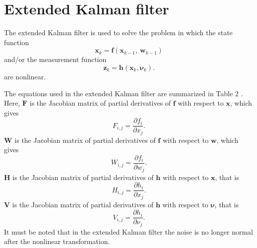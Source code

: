 \documentclass[12pt]{article}
\begin{document}

\section{Extended Kalman filter}\label{extended-kalman-filter}

The extended Kalman filter is used to solve the problem in which the state function
%
\begin{equation}
	\mathbf{x}_{k} = \mathbf{f}( \mathbf{x}_{k - 1},\ \mathbf{w}_{k - 1})
\end{equation}
and/or the measurement function
%
\begin{equation}
	\mathbf{z}_{k} = \mathbf{h}( \mathbf{x}_{k},\boldsymbol{\nu}_{k}).
\end{equation}
%
are nonlinear.

The equations used in the extended Kalman filter are summarized in Table 2 \cite{Welch}. Here, \(\mathbf{F}\) is the Jacobian matrix of partial derivatives of \(\mathbf{f}\) with respect to \(\mathbf{x}\), which gives
%
\begin{equation}
	F_{i,j} = \frac{\partial f_{i}}{\partial x_{j}}.
\end{equation}
%
\(\mathbf{W}\) is the Jacobian matrix of partial derivatives of \(\mathbf{f}\) with respect to \(\mathbf{w}\), which gives
%
\begin{equation}
	W_{i,j} = \frac{\partial f_{i}}{\partial w_{j}}.
\end{equation}
%
\(\mathbf{H}\) is the Jacobian matrix of partial derivatives of \(\mathbf{h}\) with respect to \(\mathbf{x}\), that is
%
\begin{equation}
	H_{i,j} = \frac{\partial h_{i}}{\partial x_{j}}.
\end{equation}
%
\(\mathbf{V}\) is the Jacobian matrix of partial derivatives of \(\mathbf{h}\) with respect to \(\boldsymbol{\nu}\), that is
%
\begin{equation}
	V_{i,j} = \frac{\partial h_{i}}{\partial \nu_{j}}.
\end{equation}
%
It must be noted that in the extended Kalman filter the noise is no
longer normal after the nonlinear transformation.
\end{document}
